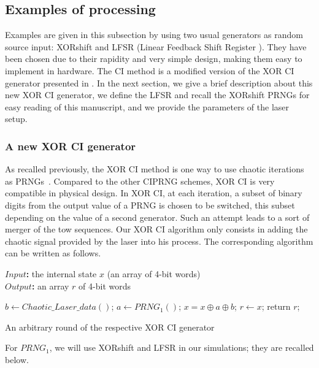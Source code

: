 \subsection{Examples of processing}

Examples are given in this subsection by using two usual generators as random source input: XORshift and LFSR (Linear Feedback Shift Register \cite{beker1982cipher}). 
They have been chosen due to their rapidity and very simple design,
making them easy to implement in hardware. 
The CI method is a modified version of the XOR CI generator presented in \cite{DBLP:journals/corr/abs-1112-5239}. 
In the next section, we give a brief description about this new XOR CI generator, 
we define the LFSR and recall the XORshift PRNGs for easy reading of this manuscript, and we provide  the parameters  of the laser setup.

\subsubsection{A new XOR CI generator}

As recalled previously, the XOR CI method is one way to use chaotic iterations
as PRNGs~\cite{DBLP:journals/corr/abs-1112-5239}. Compared to the other CIPRNG schemes, 
XOR CI is very compatible in physical design. In XOR CI, at each iteration, a subset of
binary digits from the output value of a PRNG is chosen to be switched, this subset
depending on the value of a second generator. 
Such an attempt leads to a sort of merger of the tow sequences. 
Our XOR CI algorithm only consists in adding the chaotic signal
provided by the laser into his process.
The corresponding algorithm can be written as follows.

\begin{algorithm}
\textbf{$Input$:} the internal state $x$ (an array of 4-bit words)\\
\textbf{$Output$:} an array $r$ of 4-bit words
\begin{algorithmic}[1]
\STATE$b\leftarrow{Chaotic\_Laser\_data()}$;
\STATE$a\leftarrow{PRNG_1()}$;
\STATE$x = x \oplus a \oplus b$;
\STATE$r\leftarrow{x}$;
\STATE return $r$;
\medskip
\caption{An arbitrary round of the respective XOR CI generator}
\label{XOR CI}
\end{algorithmic}
\end{algorithm}

For $PRNG_1$, we will use XORshift and LFSR in our simulations; they are recalled below.


